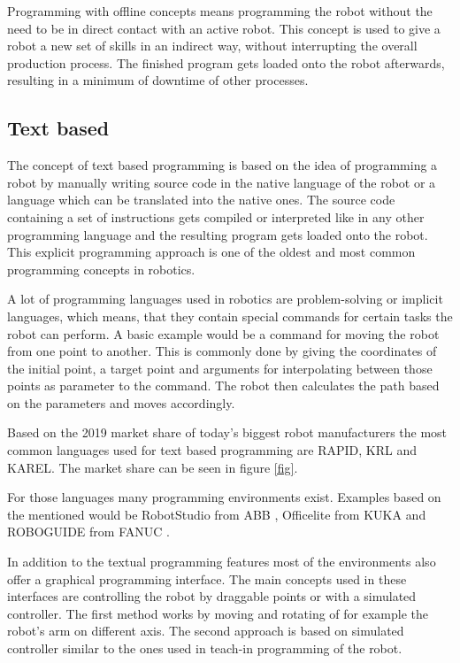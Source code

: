\documentclass[conference]{IEEEtran}
\begin{document}
    Programming with offline concepts means programming the robot without the need to be in direct contact with an active robot. This concept is used to give a robot a new set of skills in an indirect way, without interrupting the overall production process.
    The finished program gets loaded onto the robot afterwards, resulting in a minimum of downtime of other processes. \cite[p. 186]{b4}

    \subsection{Text based}

        The concept of text based programming is based on the idea of programming a robot by manually writing source code in the native language of the robot or a language which can be translated into the native ones. \cite[p. 184]{b5} 
        The source code containing a set of instructions gets compiled or interpreted like in any other programming language and the resulting program gets loaded onto the robot. \cite[p. 197]{b4}
        This explicit programming approach is one of the oldest and most common programming concepts in robotics. \cite[p. 105]{b6}

        A lot of programming languages used in robotics are problem-solving or implicit languages, which means, that they contain special commands for certain tasks the robot can perform. A basic example would be a command for moving the robot from one point to another. This is commonly done by giving the coordinates of the initial point, a target point and arguments for interpolating between those points as parameter to the command. The robot then calculates the path based on the parameters and moves accordingly. \cite[pp. 186 - 187]{b5}
               
        Based on the 2019 market share of today's biggest robot manufacturers the most common languages used for text based programming are RAPID, KRL and KAREL. \cite{s1} The market share can be seen in figure \ref{fig}.

        For those languages many programming environments exist. Examples based on the mentioned would be RobotStudio from ABB \cite{i1}, Officelite from KUKA \cite{i2} and ROBOGUIDE from FANUC \cite{i3}.

        In addition to the textual programming features most of the environments also offer a graphical programming interface.
        The main concepts used in these interfaces are controlling the robot by draggable points or with a simulated controller.
        The first method works by moving and rotating of for example the robot's arm on different axis. 
        The second approach is based on simulated controller similar to the ones used in teach-in programming of the robot. \cite[pp. 106 - 108]{b2}
\end{document}
